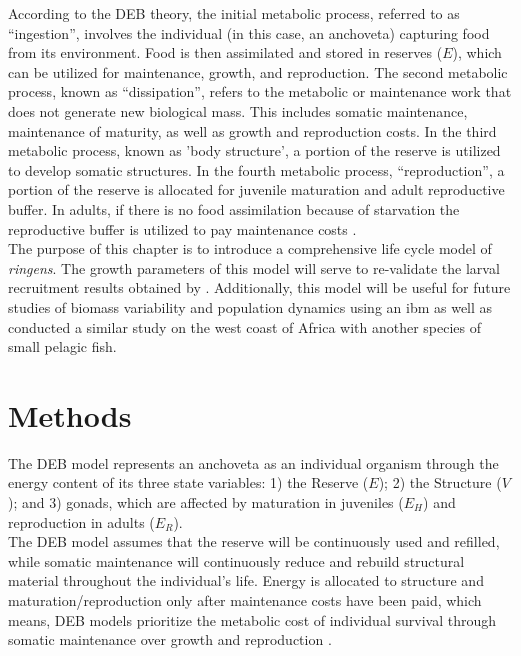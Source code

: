 According to the DEB theory, the initial metabolic process, referred to as ``ingestion'', involves the individual (in this case, an anchoveta) capturing food from its environment. Food is then assimilated and stored in reserves ($E$), which can be utilized for maintenance, growth, and reproduction. The second metabolic process, known as ``dissipation'', refers to the metabolic or maintenance work that does not generate new biological mass. This includes somatic maintenance, maintenance of maturity, as well as growth and reproduction costs. In the third metabolic process, known as 'body structure', a portion of the reserve is utilized to develop somatic structures. In the fourth metabolic process, ``reproduction'', a portion of the reserve is allocated for juvenile maturation and adult reproductive buffer. In adults, if there is no food assimilation because of starvation the
reproductive buffer is utilized to pay maintenance costs \citep{PethRoos2013,NisbMull2000,NisbJusu2012}.\\

The purpose of this chapter is to introduce a comprehensive life cycle model of \textit{\gls{ringens}}. The growth parameters of this model will serve to re-validate the larval recruitment results obtained by \citep{FlorLett2023}. Additionally, this model will be useful for future studies of biomass variability and population dynamics using an \gls{ibm} as well as \citep{BrocAuge2018} conducted a similar study on the west coast of Africa with another species of small pelagic fish.\\

\clearpage
\section{Methods}

The DEB model represents an anchoveta as an individual organism through the energy content of its three state variables: 1) the Reserve ($E$); 2) the Structure ($V$); and 3) gonads, which are affected by maturation in juveniles ($E_{H}$) and reproduction in adults ($E_{R}$).\\

The DEB model assumes that the reserve will be continuously used and refilled, while somatic
maintenance will continuously reduce and rebuild structural material throughout the individual's life. Energy is allocated to structure and maturation/reproduction only after maintenance costs have been paid, which means, DEB models prioritize the metabolic cost of individual survival through somatic maintenance over growth and reproduction \citep{Kooi2009}.\\

